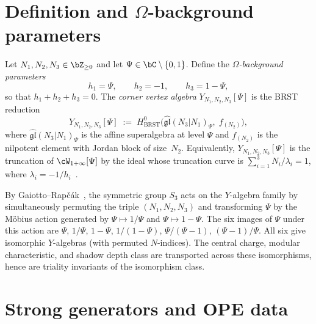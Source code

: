 \section{Definition and $\Omega$-background parameters}%
\label{sec:y-definition}

\begin{definition}%
\label{def:corner-voa}
\ClaimStatusDefinitional%
Let $N_1, N_2, N_3 \in \bZ_{\geq 0}$ and let
$\Psi \in \bC \setminus \{0, 1\}$. Define the
\emph{$\Omega$-background parameters}
\begin{equation}\label{eq:y-omega-params}
h_1 = \Psi, \qquad h_2 = -1, \qquad h_3 = 1 - \Psi,
\end{equation}
so that $h_1 + h_2 + h_3 = 0$. The
\emph{corner vertex algebra} $Y_{N_1,N_2,N_3}[\Psi]$ is the
BRST reduction
\begin{equation}\label{eq:y-brst-definition}
Y_{N_1,N_2,N_3}[\Psi]
\;:=\;
H^0_{\mathrm{BRST}}\bigl(
 \widehat{\mathfrak{gl}}(N_3|N_1)_\Psi,\;
 f_{(N_2)}
\bigr),
\end{equation}
where $\widehat{\mathfrak{gl}}(N_3|N_1)_\Psi$ is the affine
superalgebra at level $\Psi$ and $f_{(N_2)}$ is the nilpotent
element with Jordan block of size~$N_2$. Equivalently,
$Y_{N_1,N_2,N_3}[\Psi]$ is the truncation of
$\cW_{1+\infty}[\Psi]$ by the ideal whose truncation curve is
$\sum_{i=1}^3 N_i / \lambda_i = 1$, where
$\lambda_i = -1/h_i$~\cite[eq.~3.35]{gaiotto-rapchak}.
\end{definition}

\begin{remark}%
\label{rem:y-triality}
By Gaiotto--Rap\v{c}\'ak~\cite[eq.~3.38]{gaiotto-rapchak},
the symmetric group $S_3$ acts on the $Y$-algebra family by
simultaneously permuting the triple $(N_1, N_2, N_3)$ and
transforming $\Psi$ by the M\"obius action generated by
$\Psi \mapsto 1/\Psi$ and $\Psi \mapsto 1 - \Psi$. The
six images of $\Psi$ under this action are
$\Psi$, $1/\Psi$, $1 - \Psi$, $1/(1-\Psi)$,
$\Psi/(\Psi - 1)$, $(\Psi - 1)/\Psi$.
All six give isomorphic $Y$-algebras (with permuted
$N$-indices). The central charge, modular characteristic, and
shadow depth class are transported across these isomorphisms, hence are
triality invariants of the isomorphism class.
\end{remark}


\section{Strong generators and OPE data}%
\label{sec:y-generators}

